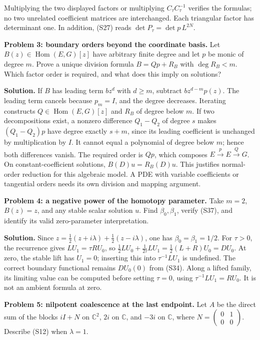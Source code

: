 \documentclass[
  11pt,
]{article}
\begin{document}
Multiplying the two displayed factors or multiplying
\(C_\tau C_\tau^{-1}\) verifies the formulas; no two unrelated
coefficient matrices are interchanged. Each triangular factor has
determinant one. In addition, (S27) reads
\(\det P_\tau=\det p\,L^{2N}\).

\textbf{Problem 3: boundary orders beyond the coordinate basis.} Let
\(B(z)\in\operatorname{Hom}(E,G)[z]\) have arbitrary finite degree and
let \(p\) be monic of degree \(m\). Prove a unique division formula
\(B=Qp+R_B\) with \(\deg R_B<m\). Which factor order is required, and
what does this imply on solutions?

\textbf{Solution.} If \(B\) has leading term \(bz^d\) with \(d\geq m\),
subtract \(bz^{d-m}p(z)\). The leading term cancels because \(p_m=I\),
and the degree decreases. Iterating constructs
\(Q\in\operatorname{Hom}(E,G)[z]\) and \(R_B\) of degree below \(m\). If
two decompositions exist, a nonzero difference \(Q_1-Q_2\) of degree
\(s\) makes \((Q_1-Q_2)p\) have degree exactly \(s+m\), since its
leading coefficient is unchanged by multiplication by \(I\). It cannot
equal a polynomial of degree below \(m\); hence both differences vanish.
The required order is \(Qp\), which composes
\(E\xrightarrow{p}E\xrightarrow{Q}G\). On constant-coefficient
solutions, \(B(D)u=R_B(D)u\). This justifies normal-order reduction for
this algebraic model. A PDE with variable coefficients or tangential
orders needs its own division and mapping argument.

\textbf{Problem 4: a negative power of the homotopy parameter.} Take
\(m=2\), \(B(z)=z\), and any stable scalar solution \(u\). Find
\(\beta_0,\beta_1\), verify (S37), and identify its valid zero-parameter
interpretation.

\textbf{Solution.} Since
\(z=\tfrac12(z+i\lambda)+\tfrac12(z-i\lambda)\), one has
\(\beta_0=\beta_1=1/2\). For \(\tau>0\), the recurrence gives
\(LU_1=\tau RU_0\), so
\(\tfrac12 LU_0+\tfrac1{2\tau}LU_1=\tfrac12(L+R)U_0=DU_0\). At zero, the
stable lift has \(U_1=0\); inserting this into \(\tau^{-1}LU_1\) is
undefined. The correct boundary functional remains \(DU_0(0)\) from
(S34). Along a lifted family, its limiting value can be computed before
setting \(\tau=0\), using \(\tau^{-1}LU_1=RU_0\). It is not an ambient
formula at zero.

\textbf{Problem 5: nilpotent coalescence at the last endpoint.} Let
\(A\) be the direct sum of the blocks \(iI+N\) on \(\mathbb C^2\),
\(2i\) on \(\mathbb C\), and \(-3i\) on \(\mathbb C\), where
\(N=\left(\begin{smallmatrix}0&1\\0&0\end{smallmatrix}\right)\).
Describe (S12) when \(\lambda=1\).
\end{document}

